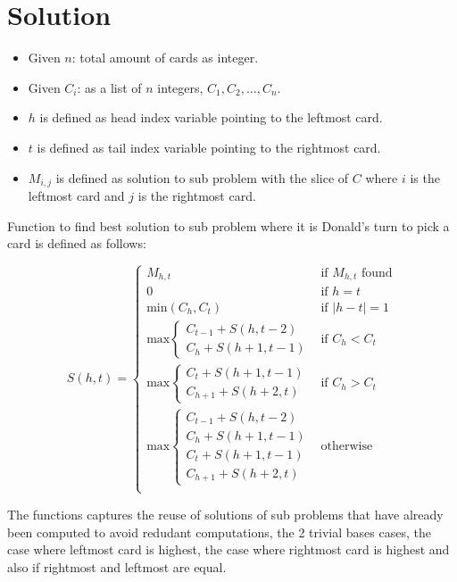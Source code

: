 \section{Solution}

\begin{itemize}
    \item Given $n$: total amount of cards as integer.
    \item Given $C_i$: as a list of $n$ integers, $C_1, C_2,..., C_n$.
    \item $h$ is defined as head index variable pointing to the leftmost card.
    \item $t$ is defined as tail index variable pointing to the rightmost card.
    \item $M_{i,j}$ is defined as solution to sub problem with the slice of $C$ where $i$ is the leftmost card and $j$ is the rightmost card.
\end{itemize}

Function to find best solution to sub problem where it is Donald's turn to pick a card is defined as follows:

$$ S(h,t) = \begin{cases}
    M_{h,t} & \text{if $M_{h,t}$ found} \\
    0 & \text{if $h = t$} \\
    \text{min}(C_h, C_t) & \text{if $|h-t| = 1$} \\
    \text{max} \begin{cases}
        C_{t-1} + S(h, t-2) \\
        C_h + S(h+1,t-1)
    \end{cases} & \text{if $C_h < C_t$ } \\
    \text{max} \begin{cases}
        C_t + S(h+1, t-1) \\
        C_{h+1} + S(h+2,t)
    \end{cases} & \text{if $C_h > C_t$ } \\
    \text{max} \begin{cases}
        C_{t-1} + S(h, t-2) \\
        C_h + S(h+1,t-1) \\
        C_t + S(h+1, t-1) \\
        C_{h+1} + S(h+2,t)
    \end{cases} & \text{otherwise} \\
\end{cases} $$

The functions captures the reuse of solutions of sub problems that have already been computed to avoid redudant computations, the 2 trivial bases cases, the case where leftmost card is highest, the case where rightmost card is highest and also if rightmost and leftmost are equal.

